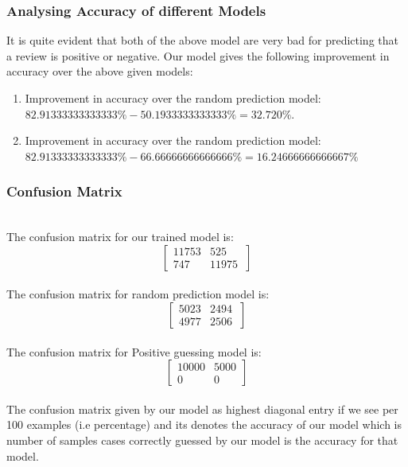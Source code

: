\documentclass[11pt]{article}
\begin{document}
\subsubsection{Analysing Accuracy of different Models}
It is quite evident that both of the above model are very bad for predicting that a review is positive or negative. Our model gives the following improvement in accuracy over the above given models:
\begin{enumerate}
  \item Improvement in accuracy over the random prediction model: $82.91333333333333\%-50.1933333333333\%=32.720\%$.
  \item Improvement in accuracy over the random prediction model: $82.91333333333333\%-66.66666666666666\%=16.24666666666667\%$
\end{enumerate}

\subsubsection{Confusion Matrix}
\\
The confusion matrix for our trained model is:
$$\begin{bmatrix}

11753 & 525 \\

747 & 11975 \
\end{bmatrix}$$
\\
The confusion matrix for random prediction model is:
$$\begin{bmatrix}

5023 & 2494 \\

4977 & 2506 \
\end{bmatrix}$$
\\

The confusion matrix for Positive guessing model is:
$$\begin{bmatrix}

10000 & 5000 \\

0 & 0 \
\end{bmatrix}$$
\\

The confusion matrix given by our model as highest diagonal entry if we see per 100 examples (i.e percentage) and its denotes the accuracy of our model which is number of samples cases correctly guessed by our model is the accuracy for that model.
\\
\end{document}
